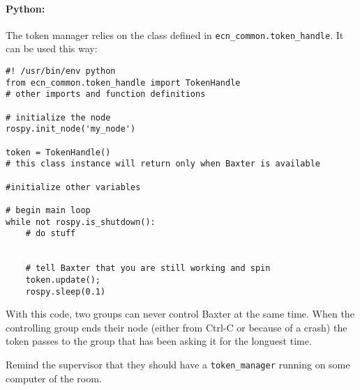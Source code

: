 \documentclass{ecnreport}
\begin{document}
 \paragraph{Python: } The token manager relies on the class defined in \texttt{ecn\_common.token\_handle}. It can be used this way:
\pythonstyle \begin{lstlisting}
#! /usr/bin/env python
from ecn_common.token_handle import TokenHandle
# other imports and function definitions

# initialize the node
rospy.init_node('my_node')

token = TokenHandle()
# this class instance will return only when Baxter is available

#initialize other variables

# begin main loop
while not rospy.is_shutdown():
    # do stuff
    
    
    # tell Baxter that you are still working and spin
    token.update();
    rospy.sleep(0.1)

\end{lstlisting}
With this code, two groups can never control Baxter at the same time. When the controlling group ends their node (either from Ctrl-C or because of a crash) the token
passes to the group that has been asking it for the longuest time.

Remind the supervisor that they should have a \texttt{token\_manager} running on some computer of the room.
\end{document}
